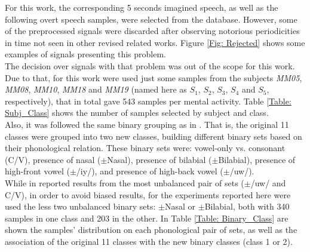 For this work, the corresponding 5 seconds imagined speech, as well as the following overt speech samples, were selected from the database. However, some of the \linebreak[4]preprocessed signals were discarded after observing notorious periodicities in time not seen in other revised related works. Figure \ref{Fig: Rejected} shows some examples of signals presenting this problem.\\

The decision over signals with that problem was out of the scope for this work. Due to that, for this work were used just some samples from the subjects \textit{MM05}, \textit{MM08}, \textit{MM10}, \textit{MM18} and \textit{MM19} (named here as $S_{1}$, $S_{2}$, $S_{3}$, $S_{4}$ and $S_{5}$, respectively), that in total gave 543 samples per mental activity. Table \ref{Table: Subj_Class} shows the number of samples selected by subject and class.\\

Also, it was followed the same binary grouping as in \cite{zhao2013combining,zhao2015classifying}. That is, the original 11 classes were grouped into two new classes, building different binary sets based on their phonological relation. These binary sets were: vowel-only vs. consonant (C/V), presence of nasal ($\pm$Nasal), presence of bilabial ($\pm$Bilabial), presence of high-front vowel ($\pm$/iy/), and presence of high-back vowel ($\pm$/uw/).\\

While in \cite{zhao2013combining,zhao2015classifying} reported results from the most unbalanced pair of sets ($\pm$/uw/ and C/V), in order to avoid biased results, for the experiments reported here were used the less two unbalanced binary sets: $\pm$Nasal or $\pm$Bilabial, both with 340 samples in one class and 203 in the other. In Table \ref{Table: Binary_Class} are shown the samples' distribution on each phonological pair of sets, as well as the association of the original 11 classes with the new binary classes (class 1 or 2).

